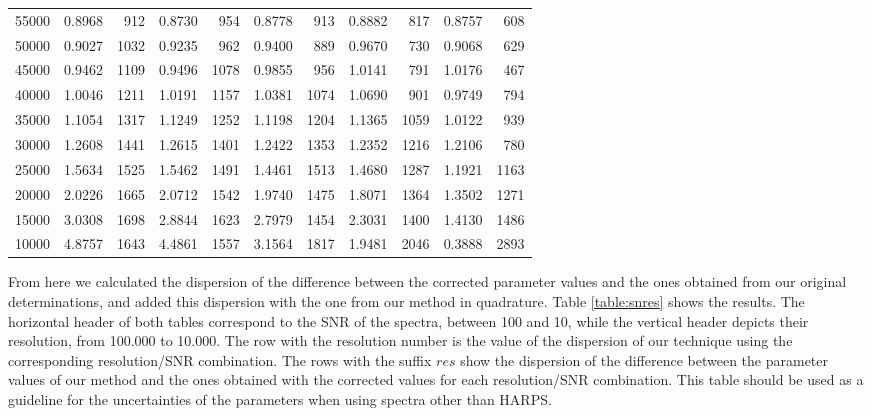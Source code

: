 \documentclass{aa}
\begin{document}
\begin{table}[]
\begin{center}
{{\begin{tabular}{l r r r r r r r r r r}
55000 & 0.8968 & 912 & 0.8730 & 954 & 0.8778 & 913 & 0.8882 & 817 & 0.8757 & 608 \\
50000 & 0.9027 & 1032 & 0.9235 & 962 & 0.9400 & 889 & 0.9670 & 730 & 0.9068 & 629 \\
45000 & 0.9462 & 1109 & 0.9496 & 1078 & 0.9855 & 956 & 1.0141 & 791 & 1.0176 & 467 \\
40000 & 1.0046 & 1211 & 1.0191 & 1157 & 1.0381 & 1074 & 1.0690 & 901 & 0.9749 & 794 \\
35000 & 1.1054 & 1317 & 1.1249 & 1252 & 1.1198 & 1204 & 1.1365 & 1059 & 1.0122 & 939 \\
30000 & 1.2608 & 1441 & 1.2615 & 1401 & 1.2422 & 1353 & 1.2352 & 1216 & 1.2106 & 780 \\
25000 & 1.5634 & 1525 & 1.5462 & 1491 & 1.4461 & 1513 & 1.4680 & 1287 & 1.1921 & 1163 \\
20000 & 2.0226 & 1665 & 2.0712 & 1542 & 1.9740 & 1475 & 1.8071 & 1364 & 1.3502 & 1271 \\
15000 & 3.0308 & 1698 & 2.8844 & 1623 & 2.7979 & 1454 & 2.3031 & 1400 & 1.4130 & 1486 \\
10000 & 4.8757 & 1643 & 4.4861 & 1557 & 3.1564 & 1817 & 1.9481 & 2046 & 0.3888 & 2893 \\
\hline
\end{tabular}
}}
\end{center}
\end{table}

From here we calculated the dispersion of the difference between the corrected parameter values and the ones obtained from our original determinations, and added this dispersion with the one from our method in quadrature. Table \ref{table:snres} shows the results. The horizontal header of both tables correspond to the SNR of the spectra, between 100 and 10,  while the vertical header depicts their resolution, from 100.000 to 10.000. The row with the resolution number is the value of the dispersion of our technique using the corresponding resolution/SNR combination. The rows with the suffix $res$ show the dispersion of the difference between the parameter values of our method and the ones obtained with the corrected values for each resolution/SNR combination. This table should be used as a guideline for the uncertainties of the parameters when using spectra other than HARPS.
\end{document}
